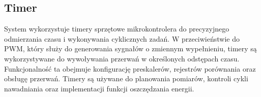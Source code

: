 \documentclass{article}
\begin{document}
\subsection{Timer}
System wykorzystuje timery sprzętowe mikrokontrolera do precyzyjnego odmierzania czasu i wykonywania cyklicznych zadań. W przeciwieństwie do PWM, który służy do generowania sygnałów o zmiennym wypełnieniu, timery są wykorzystywane do wywoływania przerwań w określonych odstępach czasu. Funkcjonalność ta obejmuje konfigurację preskalerów, rejestrów porównania oraz obsługę przerwań. Timery są używane do planowania pomiarów, kontroli cykli nawadniania oraz implementacji funkcji oszczędzania energii.











\end{document}
